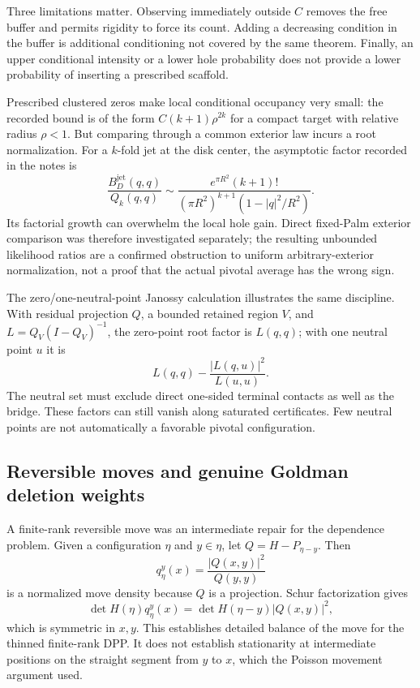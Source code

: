 \documentclass[11pt,a4paper]{article}
\theoremstyle{definition}
\theoremstyle{remark}
\numberwithin{equation}{section}
\begin{document}
Three limitations matter.  Observing immediately outside $C$ removes
the free buffer and permits rigidity to force its count.  Adding a
decreasing condition in the buffer is additional conditioning not
covered by the same theorem.  Finally, an upper conditional intensity
or a lower hole probability does not provide a lower probability of
inserting a prescribed scaffold.

Prescribed clustered zeros make local conditional occupancy very small:
the recorded bound is of the form $C(k+1)\rho^{2k}$ for a compact target
with relative radius $\rho<1$.  But comparing through a common exterior
law incurs a root normalization.  For a $k$-fold jet at the disk center,
the asymptotic factor recorded in the notes is
\[
 \frac{B_D^{\mathrm{jet}}(q,q)}{Q_k(q,q)}
 \sim
 \frac{e^{\pi R^2}(k+1)!}
      {(\pi R^2)^{k+1}(1-|q|^2/R^2)}.
\]
Its factorial growth can overwhelm the local hole gain.  Direct
fixed-Palm exterior comparison was therefore investigated separately;
the resulting unbounded likelihood ratios are a confirmed obstruction
to uniform arbitrary-exterior normalization, not a proof that the
actual pivotal average has the wrong sign.

The zero/one-neutral-point Janossy calculation illustrates the same
discipline.  With residual projection $Q$, a bounded retained region
$V$, and $L=Q_V(I-Q_V)^{-1}$, the zero-point root factor is $L(q,q)$;
with one neutral point $u$ it is
\[
 L(q,q)-\frac{|L(q,u)|^2}{L(u,u)}.
\]
The neutral set must exclude direct one-sided terminal contacts as well
as the bridge.  These factors can still vanish along saturated
certificates.  Few neutral points are not automatically a favorable
pivotal configuration.

\subsection{Reversible moves and genuine Goldman deletion weights}
\label{br:goldman}

A finite-rank reversible move was an intermediate repair for the
dependence problem.  Given a configuration $\eta$ and $y\in\eta$, let
$Q=H-P_{\eta-y}$.  Then
\[
 q_\eta^y(x)=\frac{|Q(x,y)|^2}{Q(y,y)}
\]
is a normalized move density because $Q$ is a projection.  Schur
factorization gives
\[
 \det H(\eta)q_\eta^y(x)
 =\det H(\eta-y)|Q(x,y)|^2,
\]
which is symmetric in $x,y$.  This establishes detailed balance of
the move for the thinned finite-rank DPP.  It does not establish
stationarity at intermediate positions on the straight segment from
$y$ to $x$, which the Poisson movement argument used.
\end{document}
